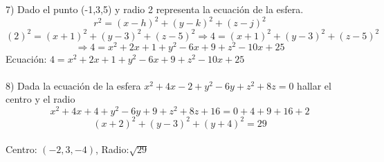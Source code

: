 \documentclass[12pt]{article}
\begin{document}
7) Dado el punto (-1,3,5) y radio 2 representa la ecuación de la esfera. 
$$r^2 = (x-h)^2 + (y-k)^2 + (z-j)^2$$
$$(2)^2 = (x+1)^2 + (y-3)^2 + (z-5)^2 \Longrightarrow 4 = (x+1)^2 + (y-3)^2 + (z-5)^2$$
$$\Longrightarrow 4 = x^2 + 2x + 1 + y^2 - 6x + 9 + z^2 - 10x + 25$$
{\centering
    Ecuación: $4 = x^2 + 2x + 1 + y^2 - 6x + 9 + z^2 - 10x + 25$
}
\\
\\

8) Dada la ecuación de la esfera $x^2 + 4x - 2 + y^2 - 6y + z^2 + 8z = 0$ hallar el centro y el radio
$$x^2 + 4x + 4 + y^2 - 6y + 9 + z^2 + 8z + 16 = 0 + 4 + 9 + 16 + 2$$
$$(x+2)^2 + (y-3)^2 + (y+4)^2 = 29$$
\\
{\centering
    Centro: $(-2,3,-4)$, Radio:$\sqrt{29}$
}
\end{document}
